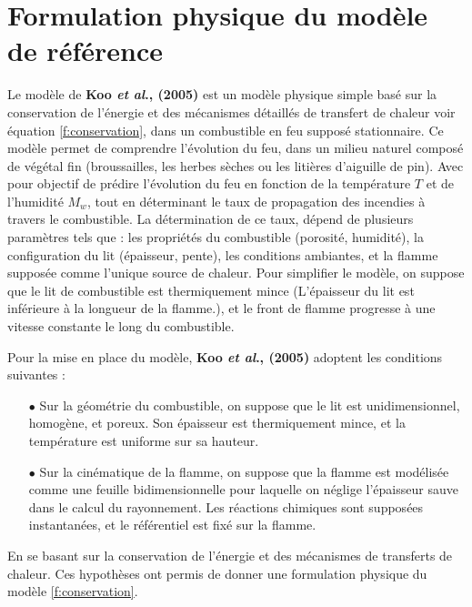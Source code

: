 \documentclass[12pt, oneside]{report} %
\theoremstyle{definition}
\theoremstyle{remark}
\begin{document}
			\section{Formulation physique du modèle de référence} 
		
			Le modèle de \textbf{Koo \textit{et al}., (2005)} est un modèle physique simple basé sur la conservation de l'énergie et des mécanismes détaillés de transfert de chaleur voir équation \eqref{f:conservation}, dans un combustible en feu supposé stationnaire. Ce modèle permet de comprendre l'évolution du feu, dans un milieu naturel composé de végétal fin (broussailles, les herbes sèches ou les litières d'aiguille de pin). Avec pour objectif de prédire l'évolution du feu en fonction de la température $T$ et de l'humidité $M_w$, tout en déterminant le taux de propagation des incendies à travers le combustible. La détermination de ce taux, dépend de plusieurs paramètres tels que : les propriétés du combustible (porosité, humidité), la configuration du lit (épaisseur, pente), les conditions ambiantes, et la flamme supposée comme l'unique source de chaleur. %
		Pour simplifier le modèle, on suppose que le lit de combustible est thermiquement mince (L'épaisseur du lit est inférieure à la longueur de la flamme.), et le front de flamme progresse à une vitesse constante le long du combustible.
		
		Pour la mise en place du modèle, \textbf{Koo \textit{et al}., (2005)} adoptent les conditions suivantes :  
		\begin{itemize}
			\item[$\bullet$] {Sur la géométrie du combustible}, on suppose que le lit est unidimensionnel, homogène, et poreux. Son épaisseur est thermiquement mince, et la température est uniforme sur sa hauteur.
			\item[$\bullet$] Sur la cinématique de la flamme, on suppose que la flamme est modélisée comme une feuille bidimensionnelle pour laquelle on néglige l'épaisseur sauve dans le calcul du rayonnement. Les réactions chimiques sont supposées instantanées, et le référentiel est fixé sur la flamme. %
			
		\end{itemize}
		En se basant sur la conservation de l'énergie et des mécanismes de transferts de chaleur. Ces hypothèses ont permis de donner une formulation physique du modèle \eqref{f:conservation}.
		
\end{document}
